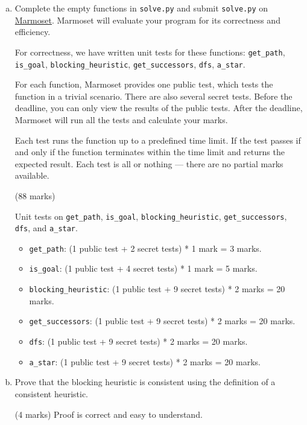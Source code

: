 \documentclass[12pt]{article}
\begin{document}
\begin{enumerate}[(a)]

\item Complete the empty functions in \verb+solve.py+ and submit \verb+solve.py+ on \href{https://marmoset.student.cs.uwaterloo.ca/}{Marmoset}. Marmoset will evaluate your program for its correctness and efficiency.

For correctness, we have written unit tests for these functions: \verb+get_path+, \verb+is_goal+, \verb+blocking_heuristic+, \verb+get_successors+, \verb+dfs+, \verb+a_star+.

For each function, Marmoset provides one public test, which tests the function in a trivial scenario. There are also several secret tests. Before the deadline, you can only view the results of the public tests. After the deadline, Marmoset will run all the tests and calculate your marks.

Each test runs the function up to a predefined time limit. If the test passes if and only if the function terminates within the time limit and returns the expected result. Each test is all or nothing --- there are no partial marks available.

\begin{markscheme}
(88 marks) 

Unit tests on \verb+get_path+, \verb+is_goal+, \verb+blocking_heuristic+, \verb+get_successors+, \verb+dfs+, and \verb+a_star+. 

\begin{itemize}
\item \verb+get_path+: (1 public test + 2 secret tests) * 1 mark = 3 marks.
\item \verb+is_goal+:  (1 public test + 4 secret tests) * 1 mark = 5 marks.
\item \verb+blocking_heuristic+: (1 public test + 9 secret tests) * 2 marks = 20 marks.
\item \verb+get_successors+: (1 public test + 9 secret tests) * 2 marks = 20 marks.
\item \verb+dfs+:    (1 public test + 9 secret tests) * 2 marks = 20 marks.
\item \verb+a_star+: (1 public test + 9 secret tests) * 2 marks = 20 marks.
\end{itemize}

\end{markscheme}
  
\item Prove that the blocking heuristic is consistent using the definition of a consistent heuristic. 
\begin{markscheme}
(4 marks) Proof is correct and easy to understand. 
\end{markscheme}
 

\end{enumerate}
\end{document}
